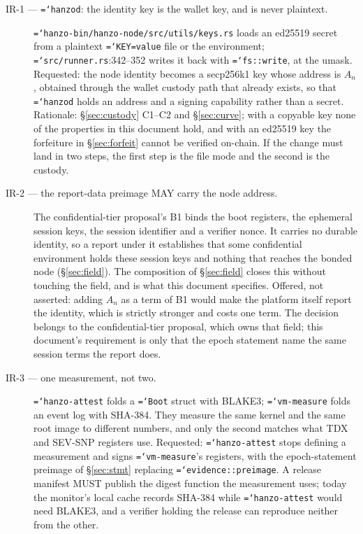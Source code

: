 \documentclass[11pt,a4paper]{article}
\newcommand{\code}[1]{\texttt{\hyphenchar\font=`\-\relax #1}}
\begin{document}
\begin{description}
\item[IR-1 --- \code{hanzod}: the identity key is the wallet key, and is never
  plaintext.] \code{hanzo-bin/hanzo-node/src/utils/keys.rs} loads an ed25519 secret
  from a plaintext \code{KEY=value} file or the environment;
  \code{src/runner.rs}:342--352 writes it back with \code{fs::write}, at the umask.
  Requested: the node identity becomes a secp256k1 key whose address is $A_n$,
  obtained through the wallet custody path that already exists, so that
  \code{hanzod} holds an address and a signing capability rather than a secret.
  Rationale: \S\ref{sec:custody} C1--C2 and \S\ref{sec:curve}; with a copyable key
  none of the properties in this document hold, and with an ed25519 key the
  forfeiture in \S\ref{sec:forfeit} cannot be verified on-chain. If the change must
  land in two steps, the first step is the file mode and the second is the custody.

\item[IR-2 --- the report-data preimage MAY carry the node address.] The
  confidential-tier proposal's B1 binds the boot registers, the ephemeral session
  keys, the session identifier and a verifier nonce. It carries no durable
  identity, so a report under it establishes that some confidential environment
  holds these session keys and nothing that reaches the bonded node
  (\S\ref{sec:field}). The composition of \S\ref{sec:field} closes this without
  touching the field, and is what this document specifies. Offered, not asserted:
  adding $A_n$ as a term of B1 would make the platform itself report the identity,
  which is strictly stronger and costs one term. The decision belongs to the
  confidential-tier proposal, which owns that field; this document's requirement is
  only that the epoch statement name the same session terms the report does.

\item[IR-3 --- one measurement, not two.] \code{hanzo-attest} folds a \code{Boot}
  struct with BLAKE3; \code{vm-measure} folds an event log with SHA-384. They
  measure the same kernel and the same root image to different numbers, and only
  the second matches what TDX and SEV-SNP registers use. Requested:
  \code{hanzo-attest} stops defining a measurement and signs \code{vm-measure}'s
  registers, with the epoch-statement preimage of \S\ref{sec:stmt} replacing
  \code{evidence::preimage}. A release manifest MUST publish the digest function
  the measurement uses; today the monitor's local cache records SHA-384 while
  \code{hanzo-attest} would need BLAKE3, and a verifier holding the release can
  reproduce neither from the other.


\end{description}
\end{document}

